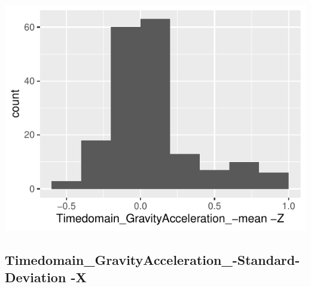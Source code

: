 \documentclass[
]{article}
\begin{document}
\begin{minipage}{0.25 \textwidth}

\includegraphics{codebook_tidydatasub_files/figure-latex/Var-11-Timedomain-GravityAcceleration--mean--Z-1.pdf}

\end{minipage}

\noindent\makebox[\linewidth]{\rule{\textwidth}{0.4pt}}

\hypertarget{timedomain_gravityacceleration_-standard-deviation--x}{%
\subsection{Timedomain\_GravityAcceleration\_-Standard-Deviation
-X}\label{timedomain_gravityacceleration_-standard-deviation--x}}
\end{document}
